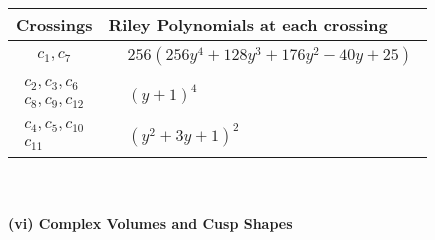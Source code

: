 \documentclass[1p]{elsarticle_modified}
\theoremstyle{definition}
\begin{document}
\begin{tabular}{m{50pt}|m{274pt}}
Crossings & \hspace{64pt}Riley Polynomials at each crossing \\
\hline $$\begin{aligned}c_{1},c_{7}\end{aligned}$$&$\begin{aligned}
&256(256 y^4+128 y^3+176 y^2-40 y+25)
\end{aligned}$\\
\hline $$\begin{aligned}c_{2},c_{3},c_{6}\\c_{8},c_{9},c_{12}\end{aligned}$$&$\begin{aligned}
&(y+1)^4
\end{aligned}$\\
\hline $$\begin{aligned}c_{4},c_{5},c_{10}\\c_{11}\end{aligned}$$&$\begin{aligned}
&(y^2+3 y+1)^2
\end{aligned}$\\
\hline
\end{tabular}\\~\\
\newpage\flushleft \textbf{(vi) Complex Volumes and Cusp Shapes}
\end{document}
